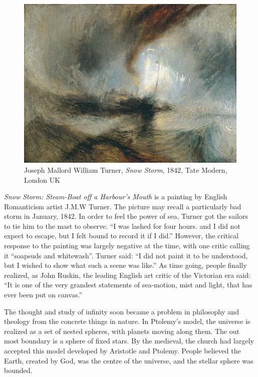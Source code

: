 \documentclass{article}
\begin{document}
\begin{figure}[htbp]
 \centering
 \includegraphics[scale=0.3]{img/Turner-Snow-Storm.jpg}
 \captionsetup{labelformat=empty}
 \caption{Joseph Mallord William Turner, {\em Snow Storm}, 1842, Tate Modern, London UK}
 \label{fig:Turner-Snow-Storm}
\end{figure}

{\em Snow Storm: Steam-Boat off a Harbour's Mouth} is a painting by English Romanticism artist J.M.W Turner. The picture may recall a particularly bad storm in January, 1842. In order to feel the power of sea, Turner got the sailors to tie him to the mast to observe. ``I was lashed for four hours. and I did not expect to escape, but I felt bound to record it if I did.'' However, the critical response to the painting was largely negative at the time, with one critic calling it ``soapsuds and whitewash''. Turner said: ``I did not paint it to be understood, but I wished to show what such a scene was like.'' As time going, people finally realized, as John Ruskin, the leading English art critic of the Victorian era said: ``It is one of the very grandest statements of sea-motion, mist and light, that has ever been put on canvas.''

The thought and study of infinity soon became a problem in philosophy and theology from the concrete things in nature. In Ptolemy's model, the universe is realized as a set of nested spheres, with planets moving along them. The out most boundary is a sphere of fixed stars. By the medieval, the church had largely accepted this model developed by Aristotle and Ptolemy. People believed the Earth, created by God, was the centre of the universe, and the stellar sphere was bounded.
\end{document}
